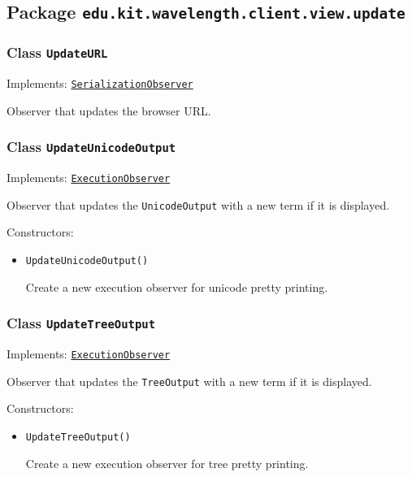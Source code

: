 \subsection{Package \lstinline{edu.kit.wavelength.client.view.update}}
\label{pkg:edu.kit.wavelength.client.view.update}


\subsubsection{Class \texttt{UpdateURL}}
\label{type:edu.kit.wavelength.client.view.update.UpdateURL}
Implements: \texttt{\hyperref[type:edu.kit.wavelength.client.view.SerializationObserver]{SerializationObserver}}

Observer that updates the browser URL.

\subsubsection{Class \texttt{UpdateUnicodeOutput}}
\label{type:edu.kit.wavelength.client.view.update.UpdateUnicodeOutput}
Implements: \texttt{\hyperref[type:edu.kit.wavelength.client.view.execution.ExecutionObserver]{ExecutionObserver}}

Observer that updates the \texttt{UnicodeOutput} with a new term if it is
 displayed.

Constructors:
\begin{itemize}
\item \texttt{UpdateUnicodeOutput()}

Create a new execution observer for unicode pretty printing.

\end{itemize}

\subsubsection{Class \texttt{UpdateTreeOutput}}
\label{type:edu.kit.wavelength.client.view.update.UpdateTreeOutput}
Implements: \texttt{\hyperref[type:edu.kit.wavelength.client.view.execution.ExecutionObserver]{ExecutionObserver}}

Observer that updates the \texttt{TreeOutput} with a new term if it is
 displayed.

Constructors:
\begin{itemize}
\item \texttt{UpdateTreeOutput()}

Create a new execution observer for tree pretty printing.

\end{itemize}

